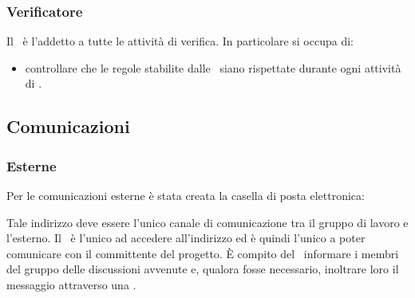 \documentclass[../NormeDiProgetto.tex]{subfiles}
\begin{document}
			\subsubsection{Verificatore}
				Il \verificatore\ è l'addetto a tutte le attività di verifica.
				In particolare si occupa di:
				\begin{itemize}
					\item controllare che le regole stabilite dalle \normediprogetto\ siano rispettate durante ogni attività di .
				\end{itemize}
		\subsection{Comunicazioni}
			\subsubsection{Esterne}
				Per le comunicazioni esterne è stata creata la casella di posta
				elettronica:
				\begin{center}
					\mailkaleidoscode
				\end{center}
				Tale indirizzo deve essere l'unico canale di comunicazione tra il
				gruppo di lavoro e l'esterno.
				Il \responsabilediprogetto\ è l'unico ad accedere
				all'indirizzo ed è quindi l'unico a poter comunicare con il
				committente del progetto. È compito del \responsabilediprogetto\ informare
				i membri del gruppo delle discussioni avvenute e,
				qualora fosse necessario, inoltrare loro il messaggio attraverso
				una .
\end{document}

